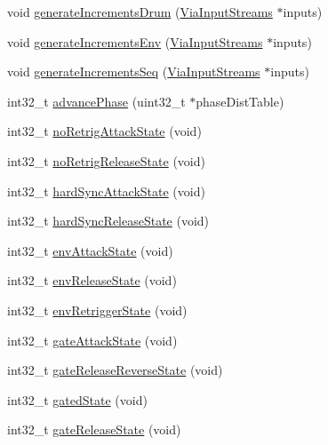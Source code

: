 \begin{DoxyCompactItemize}
\item 
void \mbox{\hyperlink{class_meta_controller_a89346194e41db563a6cc215d8223e691}{generate\+Increments\+Drum}} (\mbox{\hyperlink{class_via_input_streams}{Via\+Input\+Streams}} $\ast$inputs)
\item 
void \mbox{\hyperlink{class_meta_controller_ab5edafda7b2d14c42b80d56b3c1aba09}{generate\+Increments\+Env}} (\mbox{\hyperlink{class_via_input_streams}{Via\+Input\+Streams}} $\ast$inputs)
\item 
void \mbox{\hyperlink{class_meta_controller_ab78ff8455308bff2fb7ebff51c33790b}{generate\+Increments\+Seq}} (\mbox{\hyperlink{class_via_input_streams}{Via\+Input\+Streams}} $\ast$inputs)
\item 
int32\+\_\+t \mbox{\hyperlink{class_meta_controller_aaca3bcd3c1ad139f9743d95f206d53b6}{advance\+Phase}} (uint32\+\_\+t $\ast$phase\+Dist\+Table)
\item 
int32\+\_\+t \mbox{\hyperlink{class_meta_controller_a83b8da3f1d5f19ed4e3bccba2500691b}{no\+Retrig\+Attack\+State}} (void)
\item 
int32\+\_\+t \mbox{\hyperlink{class_meta_controller_ae3fe6a696bbbdd4eed7467b610ec72b3}{no\+Retrig\+Release\+State}} (void)
\item 
int32\+\_\+t \mbox{\hyperlink{class_meta_controller_ad61c4e2a782f372752215b10d9490319}{hard\+Sync\+Attack\+State}} (void)
\item 
int32\+\_\+t \mbox{\hyperlink{class_meta_controller_a3fd09e0d250fb666d60d643ea894e1ea}{hard\+Sync\+Release\+State}} (void)
\item 
int32\+\_\+t \mbox{\hyperlink{class_meta_controller_afd3d1fbf5121b09b014fa6b64468c78c}{env\+Attack\+State}} (void)
\item 
int32\+\_\+t \mbox{\hyperlink{class_meta_controller_a2025aa7292568159bc5e4708d305b62a}{env\+Release\+State}} (void)
\item 
int32\+\_\+t \mbox{\hyperlink{class_meta_controller_ad96c9b0dd76428cbbf4cc7e578a69319}{env\+Retrigger\+State}} (void)
\item 
int32\+\_\+t \mbox{\hyperlink{class_meta_controller_aa87c02c2098f16612329abe3dcb71710}{gate\+Attack\+State}} (void)
\item 
int32\+\_\+t \mbox{\hyperlink{class_meta_controller_aee60552d4bbf1fd4087daa09419d57b0}{gate\+Release\+Reverse\+State}} (void)
\item 
int32\+\_\+t \mbox{\hyperlink{class_meta_controller_a7381643e084577e6c5dc2a49b37ffa3a}{gated\+State}} (void)
\item 
int32\+\_\+t \mbox{\hyperlink{class_meta_controller_af8205394c094350baa9f9f7fdd2fe29c}{gate\+Release\+State}} (void)

\end{DoxyCompactItemize}
